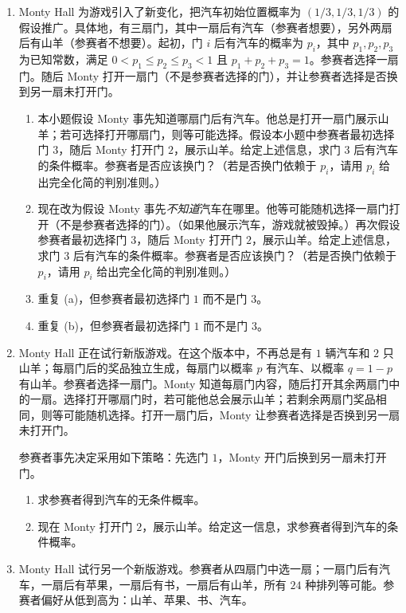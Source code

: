 \documentclass[UTF8, 12pt, fontset=fandol, oneside]{ctexart}
\begin{document}
\begin{enumerate}
  \item Monty Hall 为游戏引入了新变化，把汽车初始位置概率为 $(1/3,1/3,1/3)$ 的假设推广。具体地，有三扇门，其中一扇后有汽车（参赛者想要），另外两扇后有山羊（参赛者不想要）。起初，门 $i$ 后有汽车的概率为 $p_i$，其中 $p_1,p_2,p_3$ 为已知常数，满足 $0<p_1\le p_2\le p_3<1$ 且 $p_1+p_2+p_3=1$。参赛者选择一扇门。随后 Monty 打开一扇门（不是参赛者选择的门），并让参赛者选择是否换到另一扇未打开门。
  \begin{enumerate}
    \item 本小题假设 Monty 事先知道哪扇门后有汽车。他总是打开一扇门展示山羊；若可选择打开哪扇门，则等可能选择。假设本小题中参赛者最初选择门 $3$，随后 Monty 打开门 $2$，展示山羊。给定上述信息，求门 $3$ 后有汽车的条件概率。参赛者是否应该换门？（若是否换门依赖于 $p_i$，请用 $p_i$ 给出完全化简的判别准则。）
    \item 现在改为假设 Monty 事先\textit{不知道}汽车在哪里。他等可能随机选择一扇门打开（不是参赛者选择的门）。（如果他展示汽车，游戏就被毁掉。）再次假设参赛者最初选择门 $3$，随后 Monty 打开门 $2$，展示山羊。给定上述信息，求门 $3$ 后有汽车的条件概率。参赛者是否应该换门？（若是否换门依赖于 $p_i$，请用 $p_i$ 给出完全化简的判别准则。）
    \item 重复 (a)，但参赛者最初选择门 $1$ 而不是门 $3$。
    \item 重复 (b)，但参赛者最初选择门 $1$ 而不是门 $3$。
  \end{enumerate}

  \item Monty Hall 正在试行新版游戏。在这个版本中，不再总是有 $1$ 辆汽车和 $2$ 只山羊；每扇门后的奖品独立生成，每扇门以概率 $p$ 有汽车、以概率 $q=1-p$ 有山羊。参赛者选择一扇门。Monty 知道每扇门内容，随后打开其余两扇门中的一扇。选择打开哪扇门时，若可能他总会展示山羊；若剩余两扇门奖品相同，则等可能随机选择。打开一扇门后，Monty 让参赛者选择是否换到另一扇未打开门。

  参赛者事先决定采用如下策略：先选门 $1$，Monty 开门后换到另一扇未打开门。
  \begin{enumerate}
    \item 求参赛者得到汽车的无条件概率。
    \item 现在 Monty 打开门 $2$，展示山羊。给定这一信息，求参赛者得到汽车的条件概率。
  \end{enumerate}

  \item Monty Hall 试行另一个新版游戏。参赛者从四扇门中选一扇；一扇门后有汽车，一扇后有苹果，一扇后有书，一扇后有山羊，所有 $24$ 种排列等可能。参赛者偏好从低到高为：山羊、苹果、书、汽车。


\end{enumerate}
\end{document}
